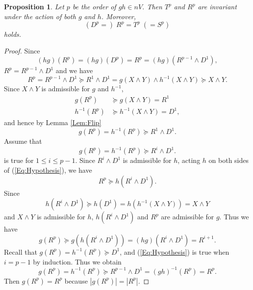 \documentclass[12pt,reqno]{amsart}
\theoremstyle{plain}
\newtheorem{proposition}[theorem]{Proposition}
\theoremstyle{definition}
\theoremstyle{remark}
\numberwithin{equation}{section}
\begin{document}
\begin{proposition}\label{Prop:Identity} 
	Let  $p$  be the order of  $gh \in nV$.  
	Then  $T^p$  and  $R^p$  are invariant under the action of both  $g$  and  $h$. 
	Moreover, 
	\begin{equation*} 
		(D^p =) \; R^p = T^p \; (= S^p)   
	\end{equation*} 
	holds.  
\end{proposition} 
\begin{proof} 
	Since 
	\begin{equation*} 
		(hg)(R^p) = (hg)(D^p) = R^p = (hg)(R^{p-1} \wedge D^1),
	\end{equation*} 
	$R^p = R^{p-1} \wedge D^1$  and we have 
	\begin{equation*} 
		R^p 
		= R^{p-1} \wedge D^1 \succeq R^1 \wedge D^1 
		= g(X \wedge Y) \wedge h^{-1}(X \wedge Y) 
		\succeq X \wedge Y.  
	\end{equation*} 
	Since  $X \wedge Y$  is admissible for  $g$  and  $h^{-1}$, 
	\begin{align*} 
		g(R^p) & \succeq g(X \wedge Y) = R^1 \\
		h^{-1}(R^p) & \succeq h^{-1}(X \wedge Y) = D^1, 
	\end{align*} 
	and hence by Lemma \ref{Lem:Flip}
	\begin{equation}\label{Eq:g(R^p)}  
		g(R^p) = h^{-1}(R^p) \succeq R^1 \wedge D^1.  
	\end{equation} 
	Assume that 
	\begin{equation}\label{Eq:Hypothesis} 
		g(R^p) = h^{-1}(R^p) \succeq R^i \wedge D^1.  
	\end{equation} 
	is true for  $1 \leq i \leq p-1$.  
	Since  $R^i \wedge D^1$  is admissible for  $h$,  
	acting  $h$  on both sides of (\ref{Eq:Hypothesis}), 
	we have 
	\begin{equation*} 
		R^p \succeq h(R^i \wedge D^1).   
	\end{equation*}  
	Since 
	\begin{equation*} 
		h(R^i \wedge D^1) \succeq  h(D^1) = h(h^{-1}(X \wedge Y)) = X \wedge Y 
	 \end{equation*} 
	 and  $X \wedge Y$  is admissible for  $h$,  
	 $h(R^i \wedge D^1)$  and  $R^p$  are admissible for  $g$.  
	 Thus we have 
	 \begin{equation*} 
	 	g(R^p) \succeq g(h(R^i \wedge D^1)) 
		= (hg)(R^i \wedge D^1) = R^{i+1}.  
	\end{equation*}  
	Recall that  $g(R^p) = h^{-1}(R^p) \succeq D^1$, 
	and (\ref{Eq:Hypothesis}) is true when  $i = p-1$  by induction.  
	Thus we obtain 
	\begin{equation*} 
		g(R^p) = h^{-1}(R^p) \succeq R^{p-1} \wedge D^1 
		=(gh)^{-1}(R^p) = R^p.   
	\end{equation*} 
	Then  $g(R^p) = R^p$  because  $|g(R^p)| = |R^p|$.  
	

\end{proof}
\end{document}
